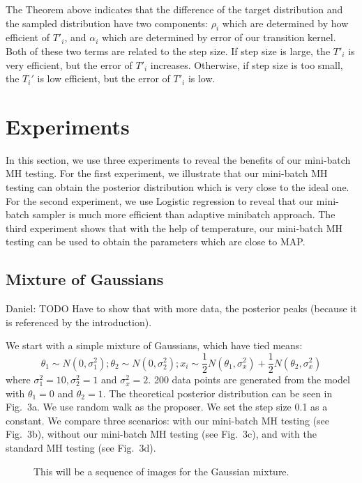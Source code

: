 \documentclass{article}
\begin{document}
The Theorem above indicates that the difference of the target distribution and the sampled distribution have two components: $\rho_i$ which are determined by how efficient of $T'_i$, and $\alpha_i$ which are determined by error of our transition kernel. Both of these two terms are related to the step size. If step size is large, the $T'_i$ is very efficient, but the error of $T'_i$ increases. Otherwise, if step size is too small, the $T_i'$ is low efficient, but the error of $T'_i$ is low.





\section{Experiments}\label{sec:experiments}

In this section, we use three experiments to reveal the benefits of our mini-batch MH testing. For
the first experiment, we illustrate that our mini-batch MH testing can obtain the posterior
distribution which is very close to the ideal one. For the second experiment, we use Logistic
regression to reveal that our mini-batch sampler is much more efficient than adaptive minibatch
approach. The third experiment shows that with the help of temperature, our mini-batch MH testing
can be used to obtain the parameters which are close to MAP. 

\subsection{Mixture of Gaussians}\label{ssec:gaussians}

{\color{blue}
Daniel: TODO Have to show that with more data, the posterior peaks (because it is referenced by the
introduction).
}

We start with a simple mixture of Gaussians, which have tied means:
\[
\theta_1 \sim N(0, \sigma_1^2); \theta_2 \sim N(0, \sigma_2^2); x_i \sim \frac{1}{2}N(\theta_1, \sigma_x^2) + \frac{1}{2} N(\theta_2, \sigma_x^2)
\]
where $\sigma_1^2 = 10, \sigma_2^2 = 1$ and $\sigma_x^2=2$. 200 data points are generated from the
model with $\theta_1 = 0$ and $\theta_2 = 1$. The theoretical posterior distribution can be seen in
Fig.~3a. We use random walk as the proposer. We set the step size 0.1 as a constant. We compare
three scenarios: with our mini-batch MH testing (see Fig.~3b), without our mini-batch MH testing
(see Fig.~3c), and with the standard MH testing (see Fig.~3d). 

\begin{figure}[t]
  \centering
  \fbox{\rule[-.5cm]{0cm}{4cm} \rule[-.5cm]{4cm}{0cm}}
  \caption{This will be a sequence of images for the Gaussian mixture.}
\end{figure}
\end{document}
